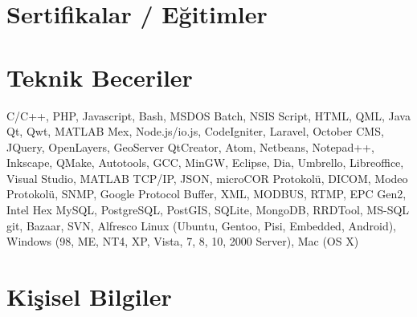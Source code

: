 \documentclass{moderncv}                           %
\begin{document}
\section{Sertifikalar / Eğitimler}




\section{Teknik Beceriler}

{C/C++, PHP, Javascript, Bash, MSDOS Batch, NSIS Script, HTML, QML, Java}
{Qt, Qwt, MATLAB Mex, Node.js/io.js, CodeIgniter, Laravel, October CMS, JQuery, OpenLayers, GeoServer}
{QtCreator, Atom, Netbeans, Notepad++, Inkscape, QMake, Autotools, GCC, MinGW, Eclipse, Dia, Umbrello, Libreoffice, Visual Studio, MATLAB}
{TCP/IP, JSON, microCOR Protokolü, DICOM, Modeo Protokolü, SNMP, Google Protocol Buffer, XML, MODBUS, RTMP, EPC Gen2, Intel Hex}
{MySQL, PostgreSQL, PostGIS, SQLite, MongoDB, RRDTool, MS-SQL}
{git, Bazaar, SVN, Alfresco}
{Linux (Ubuntu, Gentoo, Pisi, Embedded, Android), Windows (98, ME, NT4, XP, Vista, 7, 8, 10, 2000 Server), Mac (OS X)}



\section{Kişisel Bilgiler}


\nocite{*}
%
\end{document}
